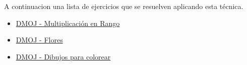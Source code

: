 A continuacion una lista de ejercicios que se resuelven aplicando esta técnica.

\begin{itemize}
	\item \href{https://dmoj.uclv.edu.cu/problem/rangem}{DMOJ - Multiplicación en Rango}
	\item \href{https://dmoj.uclv.edu.cu/problem/dibujo}{DMOJ - Flores}
	\item \href{https://dmoj.uclv.edu.cu/problem/dibujo}{DMOJ - Dibujos para colorear}
\end{itemize}